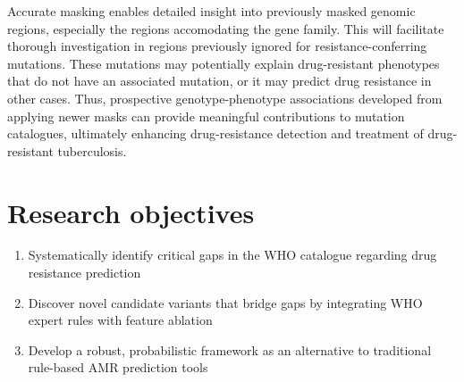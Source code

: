 Accurate masking enables detailed insight into previously masked genomic regions, especially the regions accomodating the \ppe gene family. This will facilitate thorough investigation in regions previously ignored for resistance-conferring mutations. These mutations may potentially explain drug-resistant phenotypes that do not have an associated mutation, or it may predict drug resistance in other cases. Thus, prospective genotype-phenotype associations developed from applying newer masks can provide meaningful contributions to mutation catalogues, ultimately enhancing drug-resistance detection and treatment of drug-resistant tuberculosis.  

\section{Research objectives}\label{intro:sec:objectives}
\begin{enumerate}
  \item Systematically identify critical gaps in the WHO catalogue regarding drug resistance prediction 
  \item Discover novel candidate variants that bridge gaps by integrating WHO expert rules with feature ablation
  \item Develop a robust, probabilistic framework as an alternative to traditional rule-based AMR prediction tools 
\end{enumerate}

